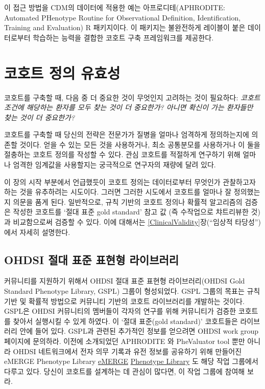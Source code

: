 \documentclass[11pt]{book}
\theoremstyle{definition}
\theoremstyle{definition}
\theoremstyle{definition}
\theoremstyle{remark}
\begin{document}
이 접근 방법을 CDM의 데이터에 적용한 예는 아프로디테(APHRODITE:
Automated PHenotype Routine for Observational Definition,
Identification, Training and Evaluation) R 패키지이다. 이 패키지는
불완전하게 레이블이 붙은 데이터로부터 학습하는 능력을 결합한 코호트 구축
프레임워크를 제공한다. \citep{Banda2017APHRODITE} 

\section{코호트 정의 유효성}\label{--}

코호트를 구축할 때, 다음 중 더 중요한 것이 무엇인지 고려하는 것이
필요하다: \emph{코호트 조건에 해당하는 환자를 모두 찾는 것이 더
중요한가? 아니면 확신이 가는 환자들만 찾는 것이 더 중요한가?}

코호트를 구축할 때 당신의 전략은 전문가가 질병을 얼마나 엄격하게
정의하는지에 의존할 것이다. 얻을 수 있는 모든 것을 사용하거나, 최소
공통분모를 사용하거나 이 둘을 절충하는 코호트 정의를 작성할 수 있다.
관심 코호트를 적절하게 연구하기 위해 얼마나 엄격한 임계값을 사용할지는
궁극적으로 연구자의 재량에 달려 있다.

이 장의 시작 부분에서 언급했듯이 코호트 정의는 데이터로부터 무엇인가
관찰하고자 하는 것을 유추하려는 시도이다. 그러면 그러한 시도에서
코호트를 얼마나 잘 정의했는지 의문을 품게 된다. 일반적으로, 규칙 기반의
코호트 정의나 확률적 알고리즘의 검증은 작성한 코호트를 `절대 표준 gold
standard' 참고 값 (즉 수작업으로 챠트리뷰한 것)과 비교함으로써 검증할 수
있다. 이에 대해서는 \ref{ClinicalValidity}장(``임상적 타당성'') 에서
자세히 설명한다.

\subsection{OHDSI 절대 표준 표현형 라이브러리}\label{ohdsi----}

커뮤니티를 지원하기 위해서 OHDSI 절대 표준 표현형 라이브러리(OHDSI Gold
Standard Phenotype Library, GSPL) 그룹이 형성되었다. GSPL 그룹의 목표는
규칙 기반 및 확률적 방법으로 커뮤니티 기반의 코호트 라이브러리를
개발하는 것이다. GSPL은 OHDSI 커뮤니티의 멤버들이 각자의 연구를 위해
커뮤니티가 검증한 코호트를 찾아서 실행시킬 수 있게 하였다. 이 `절대
표준(gold standard)' 코호트들은 라이브러리 안에 들어 있다. GSPL과 관련된
추가적인 정보를 얻으려면 OHDSI work group 페이지에 문의하라. 이전에
소개되었던 APHRODITE \citep{Banda2017APHRODITE} 와 PheValuator tool
\citep{Swerdel2019phevaluator} 뿐만 아니라 OHDSI 네트워크에서 전자 의무
기록과 유전 정보를 공유하기 위해 만들어진 eMERGE Phenotype Library
\href{https://emerge.mc.vanderbilt.edu/}{eMERGE}
\href{https://phekb.org/phenotypes}{Phenotype Library}
\citep{Hripcsak2019eMERGE} 도 해당 작업 그룹에서 다루고 있다. 당신이
코호트를 설계하는 데 관심이 많다면, 이 작업 그룹에 참여해 보라.
\end{document}
